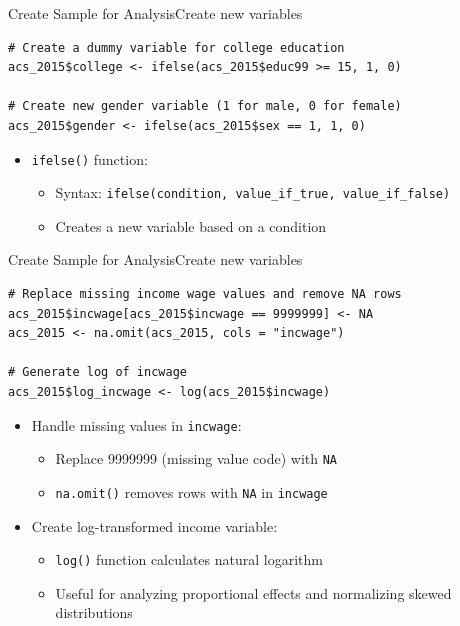 \documentclass[dvipsnames,hyperref={pdfpagelabels=false}]{beamer}
\begin{document}
\begin{frame}[fragile]{Create Sample for Analysis}{Create new variables}
\begin{lstlisting}
# Create a dummy variable for college education
acs_2015$college <- ifelse(acs_2015$educ99 >= 15, 1, 0)

# Create new gender variable (1 for male, 0 for female)
acs_2015$gender <- ifelse(acs_2015$sex == 1, 1, 0)
\end{lstlisting}
		\vspace{0.2cm}
	\begin{itemize}
		\item \texttt{ifelse()} function: 
				\vspace{0.2cm}
		\begin{itemize}
			\item Syntax: \texttt{ifelse(condition, value\_if\_true, value\_if\_false)}
					\vspace{0.2cm}
			\item Creates a new variable based on a condition
		\end{itemize}
	
	\end{itemize}
\end{frame}

\begin{frame}[fragile]{Create Sample for Analysis}{Create new variables}
\begin{lstlisting}
# Replace missing income wage values and remove NA rows
acs_2015$incwage[acs_2015$incwage == 9999999] <- NA
acs_2015 <- na.omit(acs_2015, cols = "incwage")

# Generate log of incwage
acs_2015$log_incwage <- log(acs_2015$incwage)
\end{lstlisting}
		\vspace{0.2cm}
	\begin{itemize}
		\item Handle missing values in \texttt{incwage}:
				\vspace{0.2cm}
		\begin{itemize}
			\item Replace 9999999 (missing value code) with \texttt{NA}
					\vspace{0.2cm}
			\item \texttt{na.omit()} removes rows with \texttt{NA} in \texttt{incwage}
					\vspace{0.2cm}
		\end{itemize}
		\item Create log-transformed income variable:
				\vspace{0.2cm}
		\begin{itemize}
			\item \texttt{log()} function calculates natural logarithm
					\vspace{0.2cm}
			\item Useful for analyzing proportional effects and normalizing skewed distributions
		\end{itemize}
	\end{itemize}
\end{frame}
\end{document}
